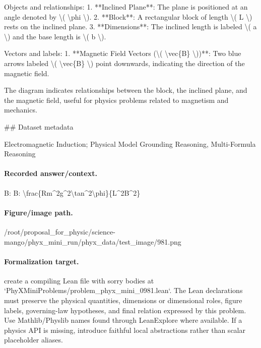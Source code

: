 Objects and relationships:
1. **Inclined Plane**: The plane is positioned at an angle denoted by \textbackslash{}( \textbackslash{}phi \textbackslash{}).
2. **Block**: A rectangular block of length \textbackslash{}( L \textbackslash{}) rests on the inclined plane.
3. **Dimensions**: The inclined length is labeled \textbackslash{}( a \textbackslash{}) and the base length is \textbackslash{}( b \textbackslash{}).

Vectors and labels:
1. **Magnetic Field Vectors (\textbackslash{}( \textbackslash{}vec\{B\} \textbackslash{}))**: Two blue arrows labeled \textbackslash{}( \textbackslash{}vec\{B\} \textbackslash{}) point downwards, indicating the direction of the magnetic field.
  
The diagram indicates relationships between the block, the inclined plane, and the magnetic field, useful for physics problems related to magnetism and mechanics.

\#\# Dataset metadata

Electromagnetic Induction; Physical Model Grounding Reasoning, Multi-Formula Reasoning

\paragraph{Recorded answer/context.}
B: B: \textbackslash{}frac\{Rm\textasciicircum{}2g\textasciicircum{}2\textbackslash{}tan\textasciicircum{}2\textbackslash{}phi\}\{L\textasciicircum{}2B\textasciicircum{}2\}

\paragraph{Figure/image path.}
/root/proposal\_for\_physic/science-mango/phyx\_mini\_run/phyx\_data/test\_image/981.png

\paragraph{Formalization target.}
create a compiling Lean file with sorry bodies at `PhyXMiniProblems/problem\_phyx\_mini\_0981.lean`. The Lean declarations must preserve the physical quantities, dimensions or dimensional roles, figure labels, governing-law hypotheses, and final relation expressed by this problem.
Use Mathlib/Physlib names found through LeanExplore where available. If a physics API is missing, introduce faithful local abstractions rather than scalar placeholder aliases.


